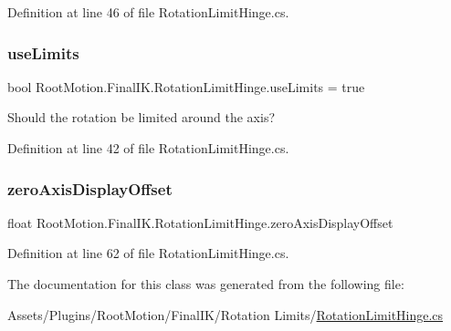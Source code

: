 Definition at line 46 of file Rotation\+Limit\+Hinge.\+cs.

\mbox{\label{class_root_motion_1_1_final_i_k_1_1_rotation_limit_hinge_acbbfed7196f956dd06e90728f5060598}} 
\subsubsection{\texorpdfstring{use\+Limits}{useLimits}}
{\footnotesize\ttfamily bool Root\+Motion.\+Final\+I\+K.\+Rotation\+Limit\+Hinge.\+use\+Limits = true}



Should the rotation be limited around the axis? 



Definition at line 42 of file Rotation\+Limit\+Hinge.\+cs.

\mbox{\label{class_root_motion_1_1_final_i_k_1_1_rotation_limit_hinge_a85d1cbf4d100a00defcee3444d0f37c7}} 
\subsubsection{\texorpdfstring{zero\+Axis\+Display\+Offset}{zeroAxisDisplayOffset}}
{\footnotesize\ttfamily float Root\+Motion.\+Final\+I\+K.\+Rotation\+Limit\+Hinge.\+zero\+Axis\+Display\+Offset}



Definition at line 62 of file Rotation\+Limit\+Hinge.\+cs.



The documentation for this class was generated from the following file\+:\begin{DoxyCompactItemize}
\item 
Assets/\+Plugins/\+Root\+Motion/\+Final\+I\+K/\+Rotation Limits/\mbox{\hyperlink{_rotation_limit_hinge_8cs}{Rotation\+Limit\+Hinge.\+cs}}\end{DoxyCompactItemize}
